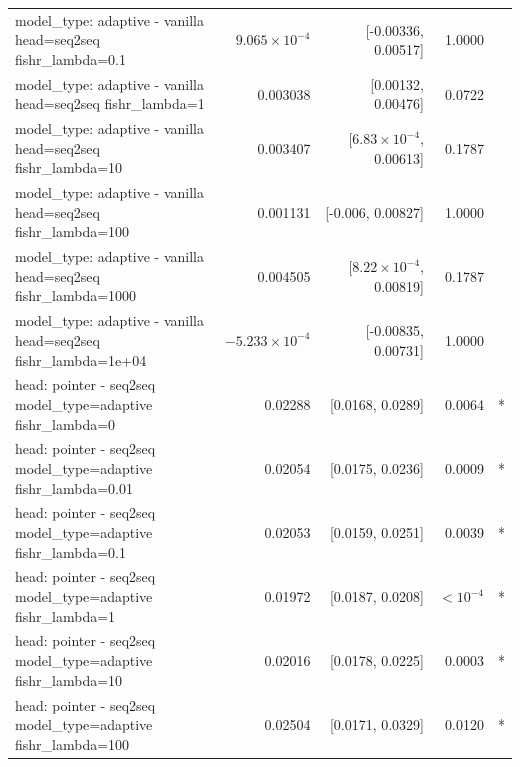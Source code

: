 \documentclass[10pt]{article}
\makeatletter
\newcommand{\stackcell}[1]{\begin{tabular}[t]{@{}l@{}}#1\end{tabular}}
\makeatother
\begin{document}
{\begin{longtable}{lrrrl}
\stackcell{model\_type: adaptive - vanilla\\\footnotesize head=seq2seq fishr\_lambda=0.1 } & $9.065\times10^{-4}$ & [-0.00336, 0.00517] & 1.0000 & \\
\stackcell{model\_type: adaptive - vanilla\\\footnotesize head=seq2seq fishr\_lambda=1 } & 0.003038 & [0.00132, 0.00476] & 0.0722 & \\
\stackcell{model\_type: adaptive - vanilla\\\footnotesize head=seq2seq fishr\_lambda=10 } & 0.003407 & [$6.83\times10^{-4}$, 0.00613] & 0.1787 & \\
\stackcell{model\_type: adaptive - vanilla\\\footnotesize head=seq2seq fishr\_lambda=100 } & 0.001131 & [-0.006, 0.00827] & 1.0000 & \\
\stackcell{model\_type: adaptive - vanilla\\\footnotesize head=seq2seq fishr\_lambda=1000 } & 0.004505 & [$8.22\times10^{-4}$, 0.00819] & 0.1787 & \\
\stackcell{model\_type: adaptive - vanilla\\\footnotesize head=seq2seq fishr\_lambda=1e+04 } & $-5.233\times10^{-4}$ & [-0.00835, 0.00731] & 1.0000 & \\
\stackcell{head: pointer - seq2seq\\\footnotesize model\_type=adaptive fishr\_lambda=0 } & 0.02288 & [0.0168, 0.0289] & 0.0064 & *\\
\stackcell{head: pointer - seq2seq\\\footnotesize model\_type=adaptive fishr\_lambda=0.01 } & 0.02054 & [0.0175, 0.0236] & 0.0009 & *\\
\stackcell{head: pointer - seq2seq\\\footnotesize model\_type=adaptive fishr\_lambda=0.1 } & 0.02053 & [0.0159, 0.0251] & 0.0039 & *\\
\stackcell{head: pointer - seq2seq\\\footnotesize model\_type=adaptive fishr\_lambda=1 } & 0.01972 & [0.0187, 0.0208] & $<10^{-4}$ & *\\
\stackcell{head: pointer - seq2seq\\\footnotesize model\_type=adaptive fishr\_lambda=10 } & 0.02016 & [0.0178, 0.0225] & 0.0003 & *\\
\stackcell{head: pointer - seq2seq\\\footnotesize model\_type=adaptive fishr\_lambda=100 } & 0.02504 & [0.0171, 0.0329] & 0.0120 & *\\

\end{longtable}}
\end{document}
